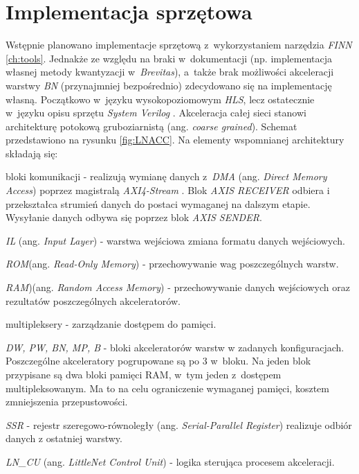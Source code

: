 \section{Implementacja sprzętowa}

Wstępnie planowano implementacje sprzętową z~wykorzystaniem narzędzia \emph{FINN} \ref{ch:tools}.
Jednakże ze względu na braki w~dokumentacji (np. implementacja własnej metody kwantyzacji w~\emph{Brevitas}), a~także brak możliwości akceleracji warstwy \emph{BN} (przynajmniej bezpośrednio) zdecydowano się na implementację własną.
Początkowo w~języku wysokopoziomowym \emph{HLS}, lecz ostatecznie w~języku opisu sprzętu \emph{System Verilog}
.
Akceleracja całej sieci stanowi architekturę potokową gruboziarnistą (ang. \emph{coarse grained}).
Schemat przedstawiono na rysunku \ref{fig:LNACC}.
Na elementy wspomnianej architektury składają się:
\begin{description}
\item  bloki komunikacji - realizują wymianę danych z~\emph{DMA} (ang. \emph{Direct Memory Access}) \cite{dma} poprzez magistralą \emph{AXI4-Stream} \cite{axis}. 
Blok \emph{AXIS RECEIVER} odbiera i przekształca strumień danych do postaci wymaganej na dalszym etapie. Wysyłanie danych odbywa się poprzez blok \emph{AXIS SENDER}.
\item \emph{IL} (ang. \emph{Input Layer}) - warstwa wejściowa zmiana formatu danych wejściowych.
\item \emph{ROM}(ang. \emph{Read-Only Memory}) - przechowywanie wag poszczególnych warstw.
\item \emph{RAM})(ang. \emph{Random Access Memory}) - przechowywanie danych wejściowych oraz rezultatów poszczególnych akceleratorów.
\item multipleksery - zarządzanie dostępem do pamięci.
\item \emph{DW, PW, BN, MP, B} - bloki akceleratorów warstw w zadanych konfiguracjach.
Poszczególne akceleratory pogrupowane są po 3 w~bloku. 
Na jeden blok przypisane są dwa bloki pamięci RAM, w~tym jeden z~dostępem  multipleksowanym.
Ma to na celu ograniczenie wymaganej pamięci, kosztem zmniejszenia przepustowości. 
\item \emph{SSR} - rejestr szeregowo-równoległy (ang. \emph{Serial-Parallel Register}) realizuje odbiór danych z ostatniej warstwy.
\item \emph{LN\_CU} (ang. \emph{LittleNet Control Unit}) -  logika sterująca procesem akceleracji.
\end{description}

